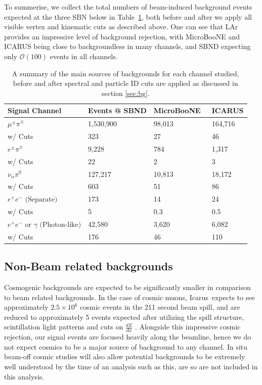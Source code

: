 \documentclass[11pt, a4paper]{article}
\newcommand{\reftab}[1]{Table~\ref{#1}}
\def\muboone{MicroBooNE}
\def\icarus{Icarus}
\begin{document}
To summerise, we collect the total numbers of beam-induced background events
expected at the three SBN below in \reftab{tab:Rates}, both before and after we
apply all visible vertex and kinematic cuts as described above. One can see
that LAr provides an impressive level of background rejection, with \muboone
and ICARUS being close to backgroundless in many channels, and SBND expecting
only $\mathcal{O}(100)$ events in all channels.

\begin{table}[t]
\centering
\begin{tabular}{ l | l |  l | l |  }
	Signal Channel & Events @ SBND & \muboone\ & ICARUS \\
\hline\hline
$\mu^\pm \pi^\mp$ &  1,530,900  & 98,013 & 164,716\\
													  w/ Cuts &323 & 27 & 46 \\ \hline
$ e^\pm \pi^\mp$ &  9,228  & 784 & 1,317\\
													  w/ Cuts &22 & 2 & 3 \\ \hline
$ \nu_\alpha \pi^0$ &   127,217 & 10,813 & 18,172\\
													  w/ Cuts &603 & 51 & 86 \\ \hline
$ e^+e^- \text{ (Separate)} $ & 173 & 14 & 24\\
													  w/ Cuts &5 & 0.3 & 0.5\\ \hline
$ e^+ e^- \text{ or } \gamma \text{ (Photon-like)}$ &  42,580 & 3,620 & 6,082\\
													  w/ Cuts &176 & 46 & 110 \\ 
 \hline \hline

\end{tabular}

\caption{\label{tab:Rates} A summary of the main sources of backgrounds for
each channel studied, before and after spectral and particle ID cuts are
applied as discussed in section \ref{sec:bg}. }

\end{table}


\subsection{Non-Beam related backgrounds}

Cosmogenic backgrounds are expected to be significantly smaller in comparison
to beam related backgrounds. In the case of cosmic muons, \icarus\ expects to
see approximately $2.5 \times 10^{6}$ cosmic events in the 211 second beam
spill, and are reduced to approximately 5 events expected after utilizing the
spill structure, scintillation light patterns and cuts on $\frac{d E}{d x}$
\cite{Antonello:2015lea}.  Alongside this impressive cosmic rejection, our
signal events are focused heavily along the beamline, hence we do not expect
cosmics to be a major source of background to any channel. In situ beam-off
cosmic studies will also allow potential backgrounds to be extremely well
understood by the time of an analysis such as this, are so are not included in
this analysis. 
\end{document}
